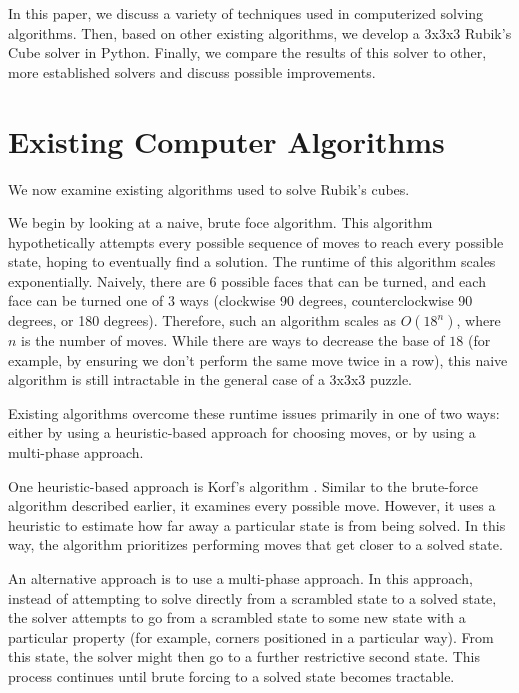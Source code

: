 \documentclass{article}
\begin{document}
In this paper, we discuss a variety of techniques used in computerized solving algorithms. Then, based on other existing algorithms, we develop a 3x3x3 Rubik's Cube solver in Python. Finally, we compare the results of this solver to other, more established solvers and discuss possible improvements.

\section{Existing Computer Algorithms}

We now examine existing algorithms used to solve Rubik's cubes.

We begin by looking at a naive, brute foce algorithm. This algorithm hypothetically attempts every possible sequence of moves to reach every possible state, hoping to eventually find a solution. The runtime of this algorithm scales exponentially. Naively, there are $6$ possible faces that can be turned, and each face can be turned one of $3$ ways (clockwise 90 degrees, counterclockwise 90 degrees, or 180 degrees). Therefore, such an algorithm scales as $O(18^n)$, where $n$ is the number of moves. While there are ways to decrease the base of $18$ (for example, by ensuring we don't perform the same move twice in a row), this naive algorithm is still intractable in the general case of a 3x3x3 puzzle.

Existing algorithms overcome these runtime issues primarily in one of two ways: either by using a heuristic-based approach for choosing moves, or by using a multi-phase approach.

One heuristic-based approach is Korf's algorithm \cite{korf}. Similar to the brute-force algorithm described earlier, it examines every possible move. However, it uses a heuristic to estimate how far away a particular state is from being solved. In this way, the algorithm prioritizes performing moves that get closer to a solved state. 

An alternative approach is to use a multi-phase approach. In this approach, instead of attempting to solve directly from a scrambled state to a solved state, the solver attempts to go from a scrambled state to some new state with a particular property (for example, corners positioned in a particular way). From this state, the solver might then go to a further restrictive second state. This process continues until brute forcing to a solved state becomes tractable.
\end{document}
